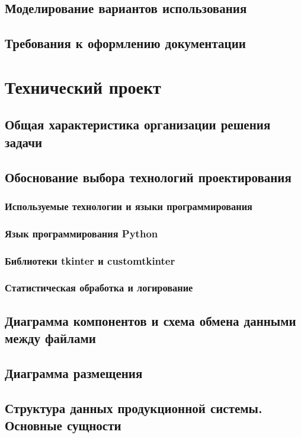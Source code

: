 \documentclass[a4paper,12pt]{report}
\begin{document}
	\section{Моделирование вариантов использования}
	\section{Требования к оформлению документации}
	
	\chapter{Технический проект}
	\section{Общая характеристика организации решения задачи}
	\section{Обоснование выбора технологий проектирования}
	\subsection{Используемые технологии и языки программирования}
	\subsection{Язык программирования Python}
	\subsection{Библиотеки tkinter и customtkinter}
	\subsection{Статистическая обработка и логирование}
	\section{Диаграмма компонентов и схема обмена данными между файлами}
	\section{Диаграмма размещения}
	\section{Структура данных продукционной системы. Основные сущности}
	
\end{document}
